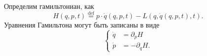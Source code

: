 \begin{to_def}
    Определим гамильтониан, как
    \begin{equation*}
        H(q, p, t) \overset{\mathrm{def}}{=}  p \cdot \dot{q} (q, p, t) - L(q, \dot{q} (q, p, t), t).
    \end{equation*}
    Уравнения Гамильтона могут быть записаны в виде
    \begin{equation*}
        \left\{\begin{aligned}
            \dot{q} &= \partial_p H \\
            \dot{p} &= -\partial_q H.
        \end{aligned}\right.
    \end{equation*}
\end{to_def}
